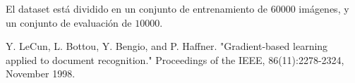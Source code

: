 \documentclass[10pt,twocolumn]{article}
\begin{document}
El dataset está dividido en un conjunto de entrenamiento de $60000$ imágenes, y un conjunto de evaluación de $10000$. 



\begin{thebibliography}{9}
Y. LeCun, L. Bottou, Y. Bengio, and P. Haffner. "Gradient-based learning applied to document recognition." Proceedings of the IEEE, 86(11):2278-2324, November 1998.
\end{thebibliography}
\end{document}
